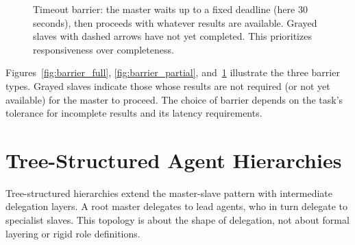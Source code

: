 \begin{figure}[t]
\centering
{}
\caption{Timeout barrier: the master waits up to a fixed deadline (here 30 seconds), then proceeds with whatever results are available. Grayed slaves with dashed arrows have not yet completed. This prioritizes responsiveness over completeness.}
\label{fig:barrier_timeout}
\end{figure}

Figures~\ref{fig:barrier_full}, \ref{fig:barrier_partial}, and~\ref{fig:barrier_timeout} illustrate the three barrier types. Grayed slaves indicate those whose results are not required (or not yet available) for the master to proceed. The choice of barrier depends on the task's tolerance for incomplete results and its latency requirements.

\section{Tree-Structured Agent Hierarchies}\label{sec:tree}

Tree-structured hierarchies extend the master-slave pattern with intermediate delegation layers. A root master delegates to lead agents, who in turn delegate to specialist slaves. This topology is about the shape of delegation, not about formal layering or rigid role definitions.

